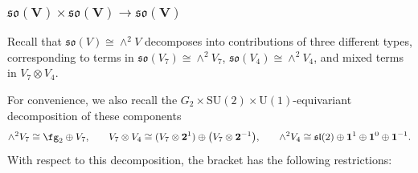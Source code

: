 \documentclass[10pt,a4paper]{amsart}
\numberwithin{equation}{section}
\theoremstyle{definition}
\def\lie#1{\ensuremath{\mathfrak{#1}}}
\def\U{\ensuremath{\mathrm{U}}}
\def\SU{\ensuremath{\mathrm{SU}}}
\begin{document}
\subsubsection[so(V) times so(V) longrightarrow so(V)]{$\boldsymbol{\lie{so}(V) \times \lie{so}(V) \longrightarrow \lie{so}(V)}$}
Recall that $\lie{so}(V) \cong \wedge^2 V$ decomposes into contributions of three different types, corresponding to terms in $\lie{so}(V_7) \cong \wedge^2 V_7$, $\lie{so}(V_4) \cong \wedge^2 V_4$, and mixed terms in $V_7 \otimes V_4$.

For convenience, we also recall the $G_2 \times \SU(2) \times \U(1)$-equivariant decomposition of these components
\begin{gather*}
 \wedge^2 V_7 \cong \fg_2 \oplus V_7 ,\qquad\!
 V_7 \otimes V_4 \cong (V_7 \otimes \textbf{2}^1) \oplus \big(V_7 \otimes \textbf{2}^{-1}\big) ,\qquad\!
 \wedge^2 V_4 \cong \lie{sl}(2) \oplus \textbf{1}^1 \oplus \textbf{1}^0 \oplus \textbf{1}^{-1}.
\end{gather*}
With respect to this decomposition, the bracket has the following restrictions:
\end{document}
